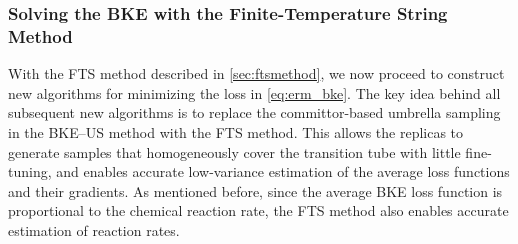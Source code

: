 \documentclass{article}
\numberwithin{equation}{section}
\theoremstyle{definition}
\theoremstyle{remark}
\begin{document}
\subsubsection{Solving the BKE with the Finite-Temperature String Method} \label{sec:bkeftsdetail} 
With the FTS method described in \cref{sec:ftsmethod}, we now proceed to construct new algorithms for minimizing the loss in \cref{eq:erm_bke}. 
The key idea  behind all subsequent new algorithms is to replace the committor-based umbrella sampling in the BKE--US method with the FTS method. 
This allows the replicas to generate samples that homogeneously cover the transition tube with little fine-tuning, and enables accurate low-variance estimation of the average loss functions and their gradients. 
As mentioned before, since the average BKE loss function is proportional to the chemical reaction rate, the FTS method also enables accurate estimation of reaction rates. 
\end{document}
